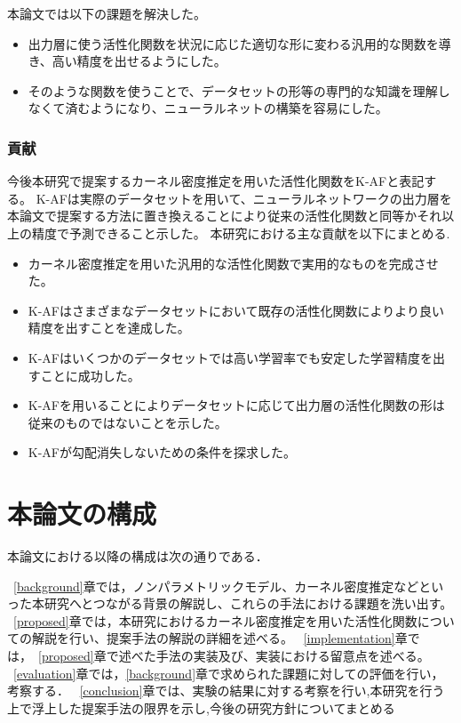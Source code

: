 本論文では以下の課題を解決した。
\begin{itemize}
  \item 出力層に使う活性化関数を状況に応じた適切な形に変わる汎用的な関数を導き、高い精度を出せるようにした。
  \item そのような関数を使うことで、データセットの形等の専門的な知識を理解しなくて済むようになり、ニューラルネットの構築を容易にした。
\end{itemize}

\subsubsection{貢献}

今後本研究で提案するカーネル密度推定を用いた活性化関数をK-AFと表記する。
K-AFは実際のデータセットを用いて、ニューラルネットワークの出力層を本論文で提案する方法に置き換えることにより従来の活性化関数と同等かそれ以上の精度で予測できること示した。
本研究における主な貢献を以下にまとめる.

\begin{itemize}
  \item カーネル密度推定を用いた汎用的な活性化関数で実用的なものを完成させた。
  \item K-AFはさまざまなデータセットにおいて既存の活性化関数によりより良い精度を出すことを達成した。
  \item K-AFはいくつかのデータセットでは高い学習率でも安定した学習精度を出すことに成功した。
  \item K-AFを用いることによりデータセットに応じて出力層の活性化関数の形は従来のものではないことを示した。
  \item K-AFが勾配消失しないための条件を探求した。
\end{itemize}


\section{本論文の構成}

本論文における以降の構成は次の通りである．

~\ref{background}章では，ノンパラメトリックモデル、カーネル密度推定などといった本研究へとつながる背景の解説し、これらの手法における課題を洗い出す。
~\ref{proposed}章では，本研究におけるカーネル密度推定を用いた活性化関数についての解説を行い、提案手法の解説の詳細を述べる。
~\ref{implementation}章では，~\ref{proposed}章で述べた手法の実装及び、実装における留意点を述べる。
~\ref{evaluation}章では，\ref{background}章で求められた課題に対しての評価を行い，考察する．
~\ref{conclusion}章では、実験の結果に対する考察を行い,本研究を行う上で浮上した提案手法の限界を示し,今後の研究方針についてまとめる






